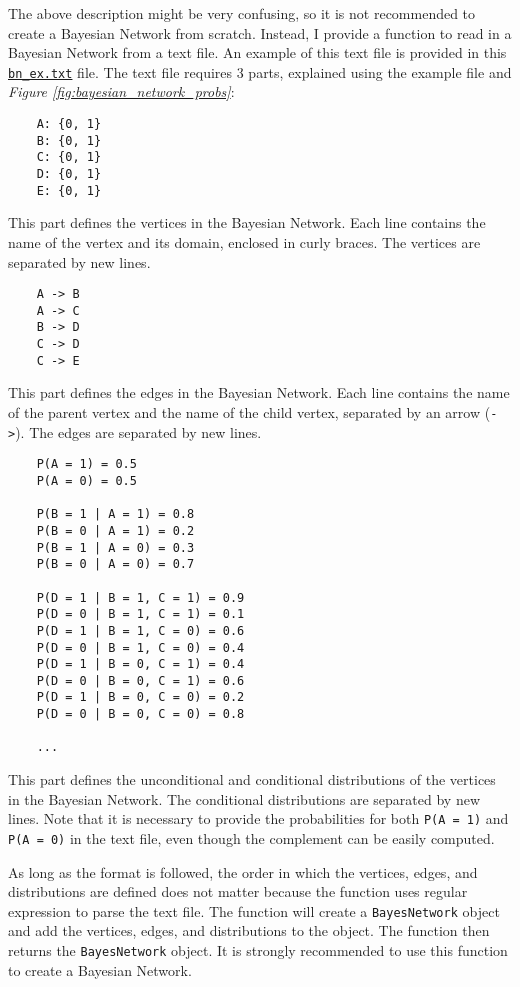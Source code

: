 \documentclass{article}
\theoremstyle{definition}
\begin{document}
The above description might be very confusing, so it is not recommended to create a Bayesian Network from scratch. Instead, I provide a function to read in a Bayesian Network from a text file. An example of this text file is provided in this \href{https://github.com/BullDF/bayes_network/blob/main/bn_ex.txt}{\texttt{bn\_ex.txt}} file. The text file requires 3 parts, explained using the example file and \textit{Figure \ref{fig:bayesian_network_probs}}:

\begin{verbatim}
    A: {0, 1}
    B: {0, 1}
    C: {0, 1}
    D: {0, 1}
    E: {0, 1}
\end{verbatim}

This part defines the vertices in the Bayesian Network. Each line contains the name of the vertex and its domain, enclosed in curly braces. The vertices are separated by new lines.

\begin{verbatim}
    A -> B
    A -> C
    B -> D
    C -> D
    C -> E
\end{verbatim}

This part defines the edges in the Bayesian Network. Each line contains the name of the parent vertex and the name of the child vertex, separated by an arrow (\texttt{->}). The edges are separated by new lines.

\begin{verbatim}
    P(A = 1) = 0.5
    P(A = 0) = 0.5

    P(B = 1 | A = 1) = 0.8
    P(B = 0 | A = 1) = 0.2
    P(B = 1 | A = 0) = 0.3
    P(B = 0 | A = 0) = 0.7

    P(D = 1 | B = 1, C = 1) = 0.9
    P(D = 0 | B = 1, C = 1) = 0.1
    P(D = 1 | B = 1, C = 0) = 0.6
    P(D = 0 | B = 1, C = 0) = 0.4
    P(D = 1 | B = 0, C = 1) = 0.4
    P(D = 0 | B = 0, C = 1) = 0.6
    P(D = 1 | B = 0, C = 0) = 0.2
    P(D = 0 | B = 0, C = 0) = 0.8
    
    ...
\end{verbatim}

This part defines the unconditional and conditional distributions of the vertices in the Bayesian Network. The conditional distributions are separated by new lines. Note that it is necessary to provide the probabilities for both \texttt{P(A = 1)} and \texttt{P(A = 0)} in the text file, even though the complement can be easily computed.

As long as the format is followed, the order in which the vertices, edges, and distributions are defined does not matter because the function uses regular expression to parse the text file. The function will create a \texttt{BayesNetwork} object and add the vertices, edges, and distributions to the object. The function then returns the \texttt{BayesNetwork} object. It is strongly recommended to use this function to create a Bayesian Network.
\end{document}
